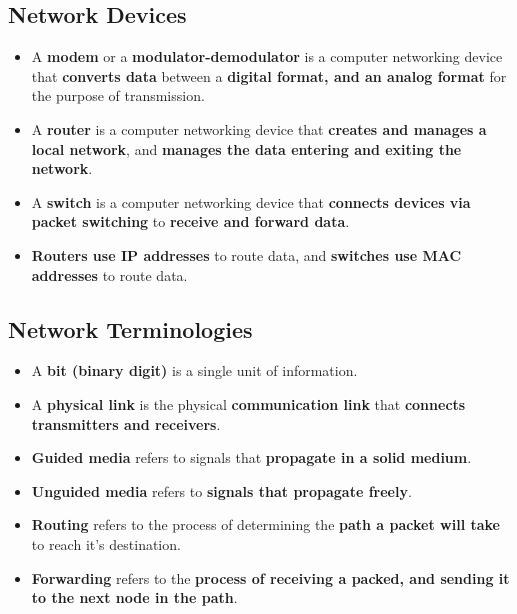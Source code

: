 \documentclass{article}
\begin{document}
    \subsection*{Network Devices}
    \begin{itemize}
        \item A \textbf{modem} or a \textbf{modulator-demodulator} is a computer networking device that \textbf{converts data} between a \textbf{digital format, and an analog format} for the purpose of transmission.
        \item A \textbf{router} is a computer networking device that \textbf{creates and manages a local network}, and \textbf{manages the data entering and exiting the network}.
        \item A \textbf{switch} is a computer networking device that \textbf{connects devices via packet switching} to \textbf{receive and forward data}.
        \item \textbf{Routers use IP addresses} to route data, and \textbf{switches use MAC addresses} to route data.
    \end{itemize}

    \subsection*{Network Terminologies}
    \begin{itemize}
        \item A \textbf{bit (binary digit)} is a single unit of information.
        \item A \textbf{physical link} is the physical \textbf{communication link} that \textbf{connects transmitters and receivers}.
        \item \textbf{Guided media} refers to signals that \textbf{propagate in a solid medium}.
        \item \textbf{Unguided media} refers to \textbf{signals that propagate freely}. 
        \item \textbf{Routing} refers to the process of determining the \textbf{path a packet will take} to reach it's destination.
        \item \textbf{Forwarding} refers to the \textbf{process of receiving a packed, and sending it to the next node in the path}. 
    \end{itemize}

\section*{}
\end{document}
